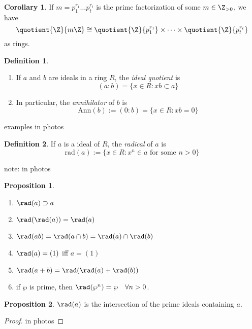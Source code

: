 \documentclass[a5paper]{article}
\theoremstyle{definition}%
\newtheorem{corollary}[theorem]{Corollary}
\newtheorem*{proposition*}{Proposition}
\newtheorem*{definition*}{Definition}
\numberwithin{exercise}{section}
\theoremstyle{remark}%
\begin{document}
\begin{corollary}
If $m=p_1^{r_1}\dots p_t^{r_t}$ is the prime factorization of some $m\in\Z_{>0}$, we have 
$$\quotient {\Z }{m\Z} \cong \quotient {\Z }{p_1^{r_1}} \times \dots \times \quotient {\Z }{p_t^{r_t}}$$ as rings. 
\end{corollary}

\begin{highlight}
\begin{definition*}
\begin{enumerate}
\item If $a$ and $b$ are ideals in a ring $R$, the \emph{ideal quotient} is 
$$(a:b) = \{x\in R : xb\subset a\}$$

\item In particular, the \emph{annihilator} of $b$ is 
$$\text{Ann}(b) := (0:b) = \{x\in R : xb=0\}$$

\end{enumerate}
\end{definition*}
\end{highlight}

examples in photos

\begin{highlight}
\begin{definition*}
If $a$ is a ideal of $R$, the \emph{radical }of $a$ is 
$$\text{rad}(a):= \{x \in R : x^n\in a \text{ for some }n>0\}$$
\end{definition*}

note: in photos
\end{highlight}

\begin{highlight}
\begin{proposition*}
\begin{enumerate}
\item $\rad(a)\supset a$
\item $\rad(\rad(a)) = \rad(a)$
\item $\rad (ab) = \rad (a\cap b) = \rad(a)\cap \rad(b)$
\item $\rad(a) = (1)$ iff $a=(1)$
\item $\rad (a+b) = \rad(\rad(a)+\rad(b))$
\item if $\wp$ is prime, then $\rad(\wp^n)=\wp \quad \forall n>0$.
\end{enumerate}
\end{proposition*}
\end{highlight}

\begin{highlight}
\begin{proposition*}
$\rad(a)$ is the intersection of the prime ideals containing $a$. 
\end{proposition*}
\end{highlight}
\begin{proof}
in photos
\end{proof}
\end{document}
